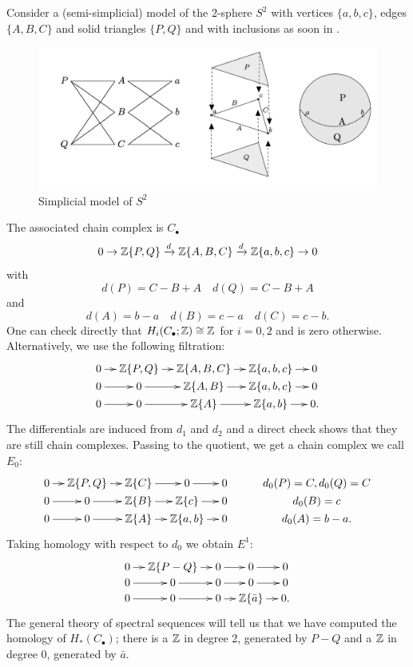 \documentclass[ma3408.tex]{subfiles}
\begin{document}
\begin{Rem}
\begin{Exa}
Consider a (semi-simplicial) model of the $2$-sphere $S^2$ with vertices $\{a,b,c\}$, edges $\{A,B,C\}$ and solid triangles $\{P,Q\}$ and with inclusions as soon in .
\begin{figure}[h!] \centering\includegraphics[scale = 0.5]{s2.png}\caption{Simplicial model of $S^2$}\label{fig:s2}\end{figure}
The associated chain complex is $C_{\bullet}$
\[
0 \to \mathbb{Z}\{ P, Q\} \xrightarrow{d} \mathbb{Z}\{A,B,C\} \xrightarrow{d} \mathbb{Z}\{a,b,c\} \to 0
\]
with
\[
d(P) = C-B+A \quad d(Q) = C-B+A
\]
and
\[
d(A) = b-a \quad d(B) = c-a \quad d(C) = c-b.
\]
One can check directly that $H_i(C_{\bullet};\mathbb{Z}) \cong \mathbb{Z}$ for $i = 0,2$ and is zero otherwise. Alternatively, we use the following filtration:
\[
\xymatrix@C=10pt@R=0pt{
0\ar[r] &\bbZ\{P,Q\}\ar[r]& \bbZ\{A,B,C\}\ar[r] & \bbZ\{a,b,c\}\ar[r]& 0\\
0\ar[r] &0\ar[r]& \bbZ\{A,B\}\ar[r] & \bbZ\{a,b,c\}\ar[r]& 0\\
0\ar[r] &0\ar[r]& \bbZ\{A\}\ar[r] & \bbZ\{a,b\}\ar[r]& 0.\\
}
\]
The differentials are induced from $d_1$ and $d_2$ and a direct check shows that they are still chain complexes. Passing to the quotient, we get a chain complex we call $E_0$:
\[
\xymatrix@C=10pt@R=0pt{
0\ar[r] &\bbZ\{P,Q\}\ar[r]& \bbZ\{C\}\ar[r] & 0\ar[r]& 0&&d_0(P)=C,d_0(Q)=C\\
0\ar[r] &0\ar[r]& \bbZ\{B\}\ar[r] & \bbZ\{c\}\ar[r]& 0&&d_0(B)=c\\
0\ar[r] &0\ar[r]& \bbZ\{A\}\ar[r] & \bbZ\{a,b\}\ar[r]& 0&&d_0(A)=b-a.\\
}
\]
Taking homology with respect to $d_0$ we obtain $E^1$:
\[
\xymatrix@C=10pt@R=0pt{
0\ar[r] &\bbZ\{P-Q\}\ar[r]& 0 \ar[r] & 0\ar[r]& 0\\
0\ar[r] &0\ar[r]& 0\ar[r] & 0\ar[r]& 0\\
0\ar[r] &0\ar[r]& 0\ar[r] & \bbZ\{\bar a\}\ar[r]& 0.\\
}
\]
The general theory of spectral sequences will tell us that we have computed the homology of $H_*(C_{\bullet})$; there is a $\mathbb{Z}$ in degree 2, generated by $P-Q$ and a $\mathbb{Z}$ in degree 0, generated by $\bar a$. 
\end{Exa}
\end{Rem}
\end{document}
